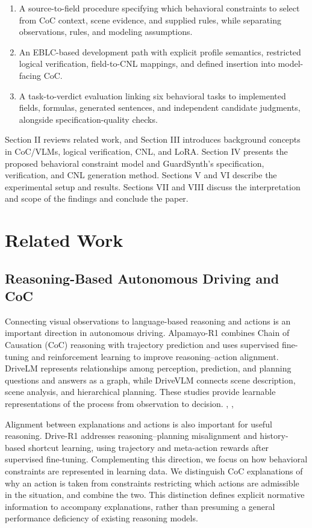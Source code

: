 \documentclass[nolineno]{ieeeaccess}
\begin{document}
\begin{enumerate}
\item A source-to-field procedure specifying which behavioral constraints to select from CoC context, scene evidence, and supplied rules, while separating observations, rules, and modeling assumptions.
\item An EBLC-based development path with explicit profile semantics, restricted logical verification, field-to-CNL mappings, and defined insertion into model-facing CoC.
\item A task-to-verdict evaluation linking six behavioral tasks to implemented fields, formulas, generated sentences, and independent candidate judgments, alongside specification-quality checks.
\end{enumerate}

Section II reviews related work, and Section III introduces background concepts in CoC/VLMs, logical verification, CNL, and LoRA. Section IV presents the proposed behavioral constraint model and GuardSynth's specification, verification, and CNL generation method. Sections V and VI describe the experimental setup and results. Sections VII and VIII discuss the interpretation and scope of the findings and conclude the paper.\par
\section{Related Work}

\subsection{Reasoning-Based Autonomous Driving and CoC}

Connecting visual observations to language-based reasoning and actions is an important direction in autonomous driving. Alpamayo-R1 combines Chain of Causation (CoC) reasoning with trajectory prediction and uses supervised fine-tuning and reinforcement learning to improve reasoning--action alignment. DriveLM represents relationships among perception, prediction, and planning questions and answers as a graph, while DriveVLM connects scene description, scene analysis, and hierarchical planning. These studies provide learnable representations of the process from observation to decision. \cite{r1}, \cite{r2}, \cite{r3}\par

Alignment between explanations and actions is also important for useful reasoning. Drive-R1 addresses reasoning--planning misalignment and history-based shortcut learning, using trajectory and meta-action rewards after supervised fine-tuning. Complementing this direction, we focus on how behavioral constraints are represented in learning data. We distinguish CoC explanations of why an action is taken from constraints restricting which actions are admissible in the situation, and combine the two. This distinction defines explicit normative information to accompany explanations, rather than presuming a general performance deficiency of existing reasoning models. \cite{r5}\par
\end{document}
